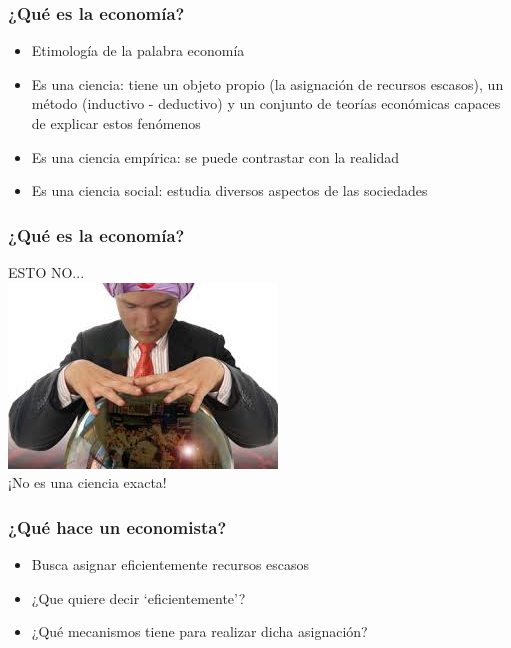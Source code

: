 \documentclass{beamer}
\begin{document}
\begin{frame}
\frametitle{¿Qu\'{e} es la economía?}
\begin{itemize}
    \item Etimología de la palabra economía 
    \item Es una ciencia: tiene un objeto propio (la asignación de recursos escasos), un método (inductivo - deductivo) y un conjunto de teorías económicas capaces de explicar estos fenómenos
    \item Es una ciencia empírica: se puede contrastar con la realidad 
    \item Es una ciencia social: estudia diversos aspectos de las sociedades
    \vspace{2mm}
\end{itemize}
\end{frame}

\begin{frame}
\frametitle{¿Qu\'{e} es la economía?}
ESTO NO...\vspace{1mm} \\
\centering 
\includegraphics[scale=0.7]{Slides Principios de Economia/Figures/Introduccion_1.2_boladecristal.jpg}
\\
¡No es una ciencia exacta!
\end{frame}

\begin{frame}
\frametitle{¿Qu\'{e} hace un economista?}
\begin{itemize}
    \item Busca asignar eficientemente recursos escasos \vspace{3mm} \\
    \item ¿Que quiere decir `eficientemente'? \vspace{3mm} \\
    \item ¿Qué mecanismos tiene para realizar dicha asignación? 
\end{itemize}
\end{frame}
\end{document}
